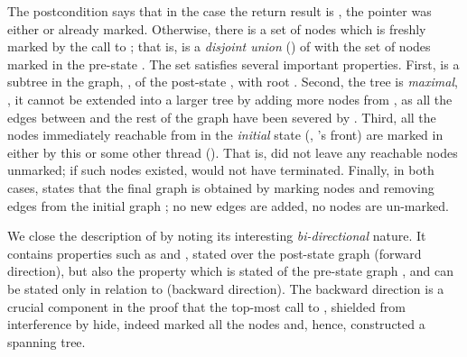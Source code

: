 The postcondition says that in the case the return result is , the pointer  was either  or already
marked. Otherwise, there is a set of nodes  which is freshly
marked by the call to ; that is,  is a
\emph{disjoint union} (\code{\\+}) of  with the set of nodes
marked in the pre-state . The set  satisfies
several important properties.
%
First,  is a subtree in the graph, , of the
post-state , with root . Second, the tree  is
\emph{maximal}, \ie, it cannot be extended into a larger tree by
adding more nodes from , as all the edges between 
and the rest of the graph have been severed by . Third, all
the nodes immediately reachable from  in the \emph{initial}
state  (\ie, 's front) are marked in  either
by this or some other thread (). That is,
 did not leave any reachable nodes unmarked; if such nodes
existed,  would not have terminated.
%
Finally, in both cases,  states that the final
graph  is obtained by marking nodes and removing edges from
the initial graph ; no new edges are added, no nodes are
un-marked.

We close the description of  by noting its interesting
\emph{bi-directional} nature. It contains properties such as
 and , stated over the post-state graph
 (forward direction), but also the property 
which is stated of the pre-state graph , and can be stated
only in relation to  (backward
direction). The backward direction is a crucial component in the proof
that the top-most call to , shielded from interference by
\textsf{hide}, indeed marked all the nodes and, hence, constructed a
spanning tree.


